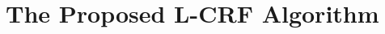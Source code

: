 \documentclass[11pt,a4paper]{article}
\theoremstyle{definition}
\begin{document}
\section{The Proposed L-CRF Algorithm}






\end{document}
